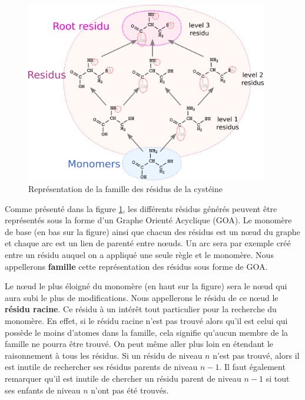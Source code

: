 \begin{figure}[!ht]
  \begin{center}
    \includegraphics[width=400px]{Figures/s2m/residues/cystein_family.png}
    \caption{\label{family}Représentation de la famille des résidus de la cystéine}
  \end{center}
\end{figure}

Comme présenté dans la figure \ref{family}, les différents résidus générés peuvent être représentés sous la forme d'un Graphe Orienté Acyclique (GOA).
Le monomère de base (en bas sur la figure) ainsi que chacun des résidus est un n\oe{}ud du graphe et chaque arc est un lien de parenté entre n\oe{}uds.
Un arc sera par exemple créé entre un résidu auquel on a appliqué une seule règle et le monomère.
Nous appellerons \textbf{famille} cette représentation des résidus sous forme de GOA.

Le n\oe{}ud le plus éloigné du monomère (en haut sur la figure) sera le n\oe{}ud qui aura subi le plus de modifications.
Nous appellerons le résidu de ce n\oe{}ud le \textbf{résidu racine}.
Ce résidu à un intérêt tout particulier pour la recherche du monomère.
En effet, si le résidu racine n'est pas trouvé alors qu'il est celui qui possède le moins d'atomes dans la famille, cela signifie qu'aucun membre de la famille ne pourra être trouvé.
On peut même aller plus loin en étendant le raisonnement à tous les résidus.
Si un résidu de niveau $n$ n'est pas trouvé, alors il est inutile de rechercher ses résidus parents de niveau $n-1$.
Il faut également remarquer qu'il est inutile de chercher un résidu parent de niveau $n-1$ si tout ses enfants de niveau $n$ n'ont pas été trouvés.

